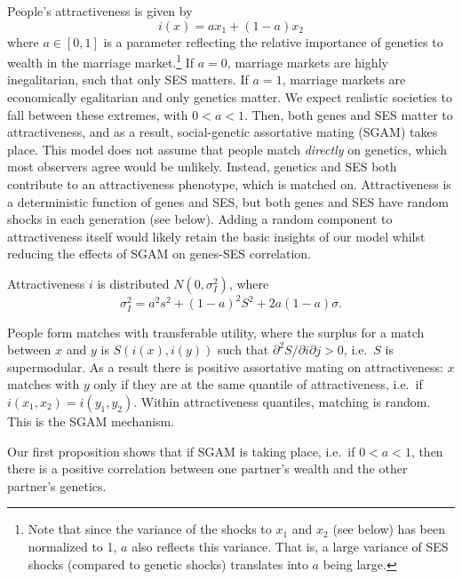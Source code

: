 \documentclass[
  12pt,
]{article}
\theoremstyle{definition}
\theoremstyle{definition}
\theoremstyle{definition}
\theoremstyle{definition}
\theoremstyle{remark}
\begin{document}
People's attractiveness is given by
\[
i\left( x\right) =ax_{1}+\left( 1-a\right) x_{2}
\]
where \(a \in [0, 1]\) is a parameter reflecting the relative importance of
genetics to wealth in the marriage market.\footnote{Note that since the variance of the shocks to \(x_1\) and \(x_2\)
  (see below) has been normalized to 1, \(a\) also reflects this variance. That
  is, a large variance of SES shocks (compared to genetic shocks) translates into
  \(a\) being large.} If \(a = 0\),
marriage markets are highly inegalitarian, such that only SES matters. If \(a =
1\), marriage markets are economically egalitarian and only genetics matter. We
expect realistic societies to fall between these extremes, with \(0 < a < 1\).
Then, both genes and SES matter to attractiveness, and as a result,
social-genetic assortative mating (SGAM) takes place. This model does not assume
that people match \emph{directly} on genetics, which most observers agree would be
unlikely. Instead, genetics and SES both contribute to an attractiveness phenotype,
which is matched on. Attractiveness is a deterministic function of genes and SES,
but both genes and SES have random shocks in each generation (see below). Adding
a random component to attractiveness itself would likely retain the basic insights
of our model whilst reducing the effects of SGAM on genes-SES correlation.

Attractiveness \(i\) is
distributed \(N(0,\sigma_{I}^{2})\), where
\[
\sigma _{I}^{2}=a^{2}s^{2}+\left( 1-a\right) ^{2}S^{2}+2a\left( 1-a\right)\sigma.
\]

People form matches with transferable utility, where the surplus for a match
between \(x\) and \(y\) is \(S(i(x), i(y))\) such that \(\partial^{2}S/\partial
i\partial j > 0\), i.e.~\(S\) is supermodular. As a result there is positive
assortative mating on attractiveness: \(x\) matches with \(y\) only if they are at
the same quantile of attractiveness, i.e.~if \(i(x_{1},x_{2}) = i(y_{1},y_{2})\).
Within attractiveness quantiles, matching is random. This is the
SGAM mechanism.

Our first proposition shows that if SGAM is taking place, i.e.~if \(0 < a < 1\), then
there is a positive correlation between one partner's wealth and the other
partner's genetics.
\end{document}
